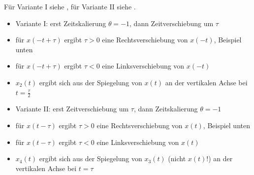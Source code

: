 \begin{Loesung}
Für Variante I siehe , für Variante II siehe
.
%
\begin{itemize}
\setlength\itemsep{-0.5em}
\item Variante I: erst Zeitskalierung $\theta=-1$, dann Zeitverschiebung um $\tau$
\item für $x(-t+\tau)$ ergibt $\tau > 0$ eine Rechtsverschiebung von $x(-t)$, Beispiel unten
\item für $x(-t+\tau)$ ergibt $\tau < 0$ eine Linksverschiebung von $x(-t)$
\item $x_2(t)$ ergibt sich aus der Spiegelung von $x(t)$ an der vertikalen Achse bei $t=\frac{\tau}{2}$
\end{itemize}
%
\begin{itemize}
\setlength\itemsep{-0.5em}
\item Variante II: erst Zeitverschiebung um $\tau$, dann Zeitskalierung $\theta=-1$
\item für $x(t-\tau)$ ergibt $\tau > 0$ eine Rechtsverschiebung von $x(t)$, Beispiel unten
\item für $x(t-\tau)$ ergibt $\tau < 0$ eine Linksverschiebung von $x(t)$
\item $x_4(t)$ ergibt sich aus der Spiegelung von $x_3(t)$ (nicht $x(t)$!) an der vertikalen Achse bei $t=\tau$
\end{itemize}
\end{Loesung}


